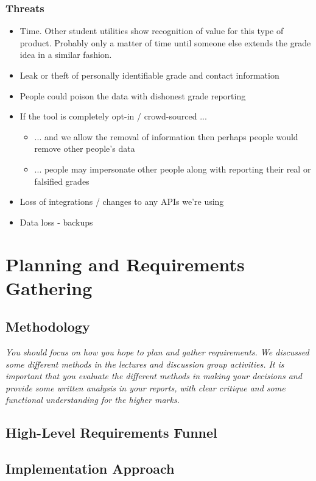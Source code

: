\documentclass{article}
\begin{document}
\subsubsection{Threats}
\begin{itemize}
    \item Time. Other student utilities show recognition of value for this type of product. Probably only a matter of time until someone else extends the grade idea in a similar fashion.
    \item Leak or theft of personally identifiable grade and contact information
    \item People could poison the data with dishonest grade reporting
    \item If the tool is completely opt-in / crowd-sourced ...
    \begin{itemize}
        \item ... and we allow the removal of information then perhaps people would remove other people's data
    \end{itemize}
    \begin{itemize}
        \item ... people may impersonate other people along with reporting their real or falsified grades
    \end{itemize}
    \item Loss of integrations / changes to any APIs we're using
    \item Data loss - backups
\end{itemize}
\section{Planning and Requirements Gathering}
\subsection{Methodology}
\textit{You should focus on how you hope to plan and gather requirements. We discussed some different methods in the lectures and discussion group activities. It is important that you evaluate the different methods in making your decisions and provide some written analysis in your reports, with clear critique and some functional understanding for the higher marks.}
\subsection{High-Level Requirements Funnel}

\subsection{Implementation Approach}
\end{document}
